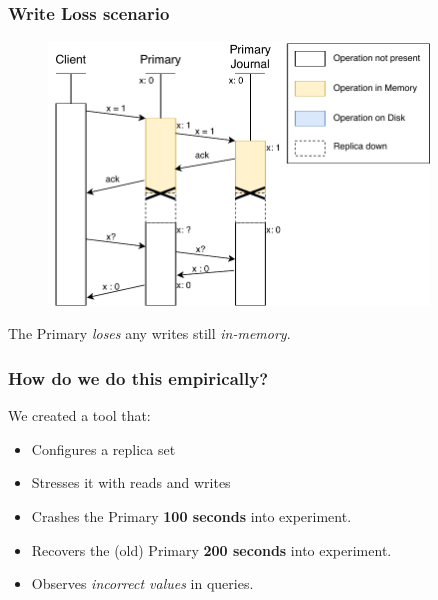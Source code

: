 \documentclass[numfooter,sectionpages,protectFrameTitle, progressbar, cblock, valigncolumns, addlogo]{beamer}
\begin{document}
\begin{frame}
    \frametitle{Write Loss scenario}

    \centering
    \begin{figure}
        \includegraphics[width=0.9\textwidth]{../images/np3.pdf}
    \end{figure}
    The Primary \textit{loses} any writes still \textit{in-memory}.
\end{frame}

\begin{frame}
    \frametitle{How do we do this empirically?}
    We created a tool that:
    \begin{itemize}
        \item Configures a replica set
        \item Stresses it with reads and writes
        \item Crashes the Primary \textbf{100 seconds} into experiment.
        \item Recovers the (old) Primary \textbf{200 seconds} into experiment.
        \item Observes \textit{incorrect values} in queries.
    \end{itemize}
\end{frame}


\end{document}
